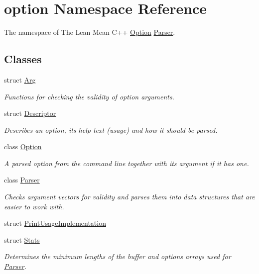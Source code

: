 \hypertarget{namespaceoption}{}\section{option Namespace Reference}
\label{namespaceoption}


The namespace of The Lean Mean C++ \hyperlink{classoption_1_1Option}{Option} \hyperlink{classoption_1_1Parser}{Parser}.  


\subsection*{Classes}
\begin{DoxyCompactItemize}
\item 
struct \hyperlink{structoption_1_1Arg}{Arg}
\begin{DoxyCompactList}\small\item\em Functions for checking the validity of option arguments. \end{DoxyCompactList}\item 
struct \hyperlink{structoption_1_1Descriptor}{Descriptor}
\begin{DoxyCompactList}\small\item\em Describes an option, its help text (usage) and how it should be parsed. \end{DoxyCompactList}\item 
class \hyperlink{classoption_1_1Option}{Option}
\begin{DoxyCompactList}\small\item\em A parsed option from the command line together with its argument if it has one. \end{DoxyCompactList}\item 
class \hyperlink{classoption_1_1Parser}{Parser}
\begin{DoxyCompactList}\small\item\em Checks argument vectors for validity and parses them into data structures that are easier to work with. \end{DoxyCompactList}\item 
struct \hyperlink{structoption_1_1PrintUsageImplementation}{Print\+Usage\+Implementation}
\item 
struct \hyperlink{structoption_1_1Stats}{Stats}
\begin{DoxyCompactList}\small\item\em Determines the minimum lengths of the buffer and options arrays used for \hyperlink{classoption_1_1Parser}{Parser}. \end{DoxyCompactList}\end{DoxyCompactItemize}
